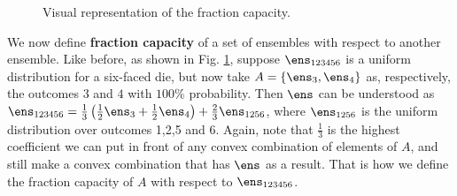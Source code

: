 \begin{figure}[h]
	\centering
	\def\xstep{0.75em}
	\def\bHeight{0.6}
	\def\tHeight{0.1}
	\def\tGap{0.3}
	\caption{Visual representation of the fraction capacity.}\label{pm-es-fig-fractionCapacity}
\end{figure}

We now define \textbf{fraction capacity} of a set of ensembles with respect to another ensemble. Like before, as shown in Fig. \ref{pm-es-fig-fractionCapacity}, suppose $\ens_{123456}$ is a uniform distribution for a six-faced die, but now take $A = \{ \ens_3, \ens_4 \}$ as, respectively, the outcomes $3$ and $4$ with $100\%$ probability. Then $\ens$ can be understood as $\ens_{123456} = \frac{1}{3} \left(\frac{1}{2} \ens_3 + \frac{1}{2} \ens_4 \right) + \frac{2}{3} \ens_{1256}$, where $\ens_{1256}$ is the uniform distribution over outcomes 1,2,5 and 6. Again, note that $\frac{1}{3}$ is the highest coefficient we can put in front of any convex combination of elements of $A$, and still make a convex combination that has $\ens$ as a result. That is how we define the fraction capacity of $A$ with respect to $\ens_{123456}$.

